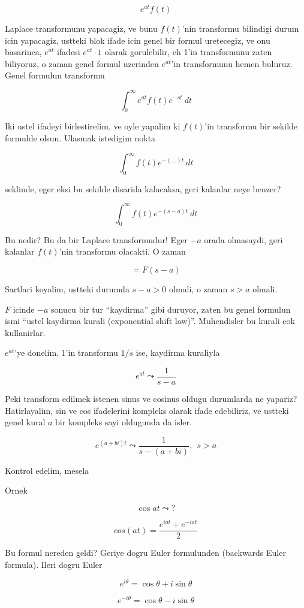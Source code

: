 \documentclass[12pt,fleqn]{article}\usepackage{../common}
\begin{document}
\[ e^{at}f(t) \]

Laplace transformunu yapacagiz, ve bunu $f(t)$'nin transformu bilindigi
durum icin yapacagiz, ustteki blok ifade icin genel bir formul uretecegiz,
ve onu basarinca, $e^{at}$ ifadesi $e^{at} \cdot 1$ olarak gorulebilir, eh
1'in transformunu zaten biliyoruz, o zaman genel formul uzerinden $e^{at}$'in
transformunu hemen buluruz. Genel formulun transformu

\[ \int_0^{\infty} e^{at} f(t)e^{-st} \ dt \]

Iki ustel ifadeyi birlestirelim, ve oyle yapalim ki $f(t)$'in transformu
bir sekilde formulde olsun. Ulasmak istedigim nokta 

\[ \int_0^{\infty} f(t)e^{-( ... )t } \ dt \]

seklinde, eger eksi bu sekilde disarida kalacaksa, geri kalanlar neye
benzer? 

\[ \int_0^{\infty} f(t)e^{-(s-a)t } \ dt \]

Bu nedir? Bu da bir Laplace transformudur! Eger $-a$ orada olmasaydi, geri
kalanlar $f(t)$'nin transformu olacakti. O zaman 

\[ = F(s-a) \]

Sartlari koyalim, ustteki durumda $s-a > 0$ olmali, o zaman $s > a$
olmali. 

$F$ icinde $-a$ sonucu bir tur ``kaydirma'' gibi duruyor, zaten bu genel
formulun ismi ``ustel kaydirma kurali (exponential shift
law)''. Muhendisler bu kurali cok kullanirlar. 

$e^{at}$'ye donelim. 1'in transformu $1/s$ ise, kaydirma kuraliyla

\[ e^{at} \leadsto \frac{1}{s-a} \]

Peki transform edilmek istenen sinus ve cosinus oldugu durumlarda ne
yapariz? Hatirlayalim, sin ve cos ifadelerini kompleks olarak ifade
edebiliriz, ve ustteki genel kural $a$ bir kompleks sayi oldugunda da
isler. 

\[ e^{(a+bi)t} \leadsto \frac{1}{s - (a+bi)}, \ \ s>a  \]

Kontrol edelim, mesela 

Ornek

\[ \cos at \leadsto ? \]

\[ cos (at) = \frac{e^{iat} + e^{-iat} }{2} \]

Bu formul nereden geldi? Geriye dogru Euler formulunden (backwards Euler
formula). Ileri dogru Euler

\[ e^{i\theta} = \cos\theta + i\sin\theta \]

\[ e^{-i\theta} = \cos\theta - i\sin\theta \]
\end{document}
